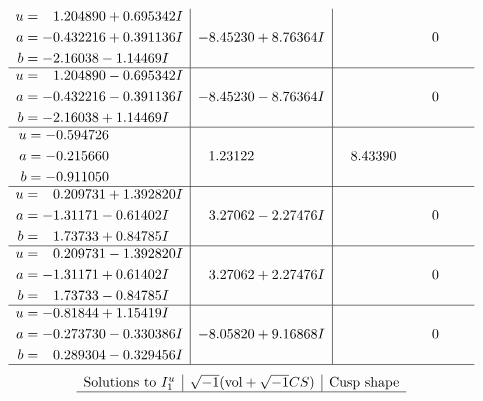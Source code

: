 \documentclass[1p]{elsarticle_modified}
\theoremstyle{definition}
\newcommand{\I}{\sqrt{-1}}
\begin{document}
$$\begin{array}{c|c|c}
\begin{aligned}
u &= \phantom{-}1.204890 + 0.695342 I \\
a &= -0.432216 + 0.391136 I \\
b &= -2.16038 - 1.14469 I\end{aligned}
 & -8.45230 + 8.76364 I & \phantom{-0.000000 } 0 \\ \hline\begin{aligned}
u &= \phantom{-}1.204890 - 0.695342 I \\
a &= -0.432216 - 0.391136 I \\
b &= -2.16038 + 1.14469 I\end{aligned}
 & -8.45230 - 8.76364 I & \phantom{-0.000000 } 0 \\ \hline\begin{aligned}
u &= -0.594726\phantom{ +0.000000I} \\
a &= -0.215660\phantom{ +0.000000I} \\
b &= -0.911050\phantom{ +0.000000I}\end{aligned}
 & \phantom{-}1.23122\phantom{ +0.000000I} & \phantom{-}8.43390\phantom{ +0.000000I} \\ \hline\begin{aligned}
u &= \phantom{-}0.209731 + 1.392820 I \\
a &= -1.31171 - 0.61402 I \\
b &= \phantom{-}1.73733 + 0.84785 I\end{aligned}
 & \phantom{-}3.27062 - 2.27476 I & \phantom{-0.000000 } 0 \\ \hline\begin{aligned}
u &= \phantom{-}0.209731 - 1.392820 I \\
a &= -1.31171 + 0.61402 I \\
b &= \phantom{-}1.73733 - 0.84785 I\end{aligned}
 & \phantom{-}3.27062 + 2.27476 I & \phantom{-0.000000 } 0 \\ \hline\begin{aligned}
u &= -0.81844 + 1.15419 I \\
a &= -0.273730 - 0.330386 I \\
b &= \phantom{-}0.289304 - 0.329456 I\end{aligned}
 & -8.05820 + 9.16868 I & \phantom{-0.000000 } 0\\
 \hline 
 \end{array}$$\newpage$$\begin{array}{c|c|c}  
\text{Solutions to }I^u_{1}& \I (\text{vol} + \sqrt{-1}CS) & \text{Cusp shape}\\
 \hline 

\end{array}$$
\end{document}
